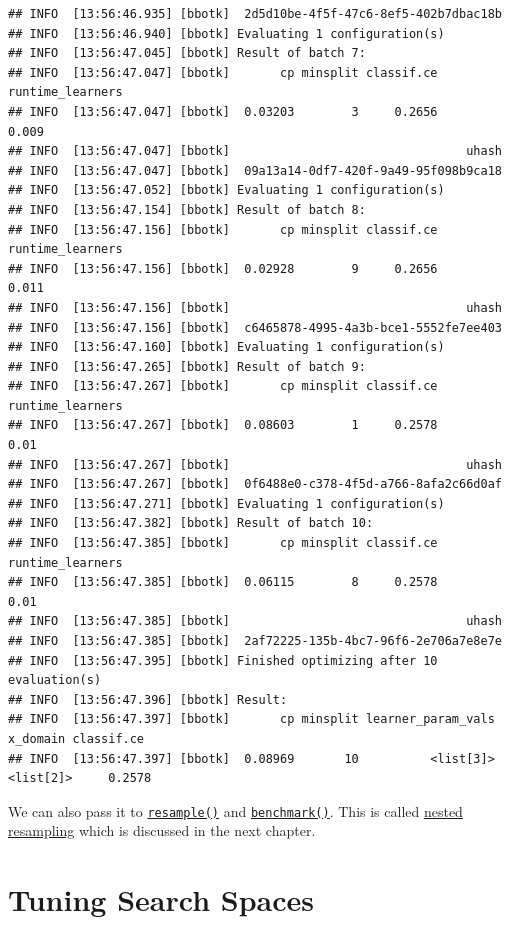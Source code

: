 \documentclass[
]{scrbook}
\begin{document}
\begin{verbatim}
## INFO  [13:56:46.935] [bbotk]  2d5d10be-4f5f-47c6-8ef5-402b7dbac18b 
## INFO  [13:56:46.940] [bbotk] Evaluating 1 configuration(s) 
## INFO  [13:56:47.045] [bbotk] Result of batch 7: 
## INFO  [13:56:47.047] [bbotk]       cp minsplit classif.ce runtime_learners 
## INFO  [13:56:47.047] [bbotk]  0.03203        3     0.2656            0.009 
## INFO  [13:56:47.047] [bbotk]                                 uhash 
## INFO  [13:56:47.047] [bbotk]  09a13a14-0df7-420f-9a49-95f098b9ca18 
## INFO  [13:56:47.052] [bbotk] Evaluating 1 configuration(s) 
## INFO  [13:56:47.154] [bbotk] Result of batch 8: 
## INFO  [13:56:47.156] [bbotk]       cp minsplit classif.ce runtime_learners 
## INFO  [13:56:47.156] [bbotk]  0.02928        9     0.2656            0.011 
## INFO  [13:56:47.156] [bbotk]                                 uhash 
## INFO  [13:56:47.156] [bbotk]  c6465878-4995-4a3b-bce1-5552fe7ee403 
## INFO  [13:56:47.160] [bbotk] Evaluating 1 configuration(s) 
## INFO  [13:56:47.265] [bbotk] Result of batch 9: 
## INFO  [13:56:47.267] [bbotk]       cp minsplit classif.ce runtime_learners 
## INFO  [13:56:47.267] [bbotk]  0.08603        1     0.2578             0.01 
## INFO  [13:56:47.267] [bbotk]                                 uhash 
## INFO  [13:56:47.267] [bbotk]  0f6488e0-c378-4f5d-a766-8afa2c66d0af 
## INFO  [13:56:47.271] [bbotk] Evaluating 1 configuration(s) 
## INFO  [13:56:47.382] [bbotk] Result of batch 10: 
## INFO  [13:56:47.385] [bbotk]       cp minsplit classif.ce runtime_learners 
## INFO  [13:56:47.385] [bbotk]  0.06115        8     0.2578             0.01 
## INFO  [13:56:47.385] [bbotk]                                 uhash 
## INFO  [13:56:47.385] [bbotk]  2af72225-135b-4bc7-96f6-2e706a7e8e7e 
## INFO  [13:56:47.395] [bbotk] Finished optimizing after 10 evaluation(s) 
## INFO  [13:56:47.396] [bbotk] Result: 
## INFO  [13:56:47.397] [bbotk]       cp minsplit learner_param_vals  x_domain classif.ce 
## INFO  [13:56:47.397] [bbotk]  0.08969       10          <list[3]> <list[2]>     0.2578
\end{verbatim}

We can also pass it to \href{https://mlr3.mlr-org.com/reference/resample.html}{\texttt{resample()}} and \href{https://mlr3.mlr-org.com/reference/benchmark.html}{\texttt{benchmark()}}. This is called \protect\hyperlink{nested-resampling}{nested resampling} which is discussed in the next chapter.

\hypertarget{searchspace}{%
\section{Tuning Search Spaces}\label{searchspace}}
\end{document}
